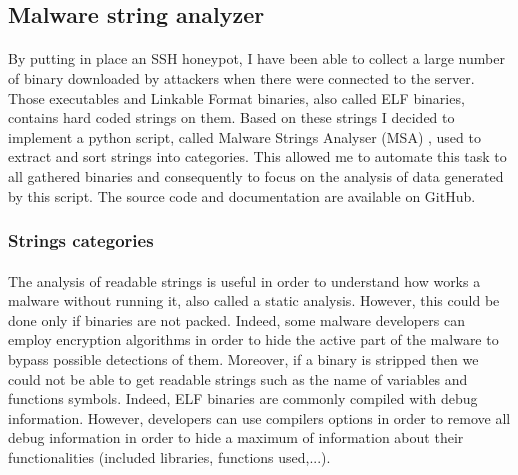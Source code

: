 \subsection{Malware string analyzer} %

\paragraph{}

By putting in place an SSH honeypot, I have been able to collect a large number of binary 
downloaded by attackers when there were connected to the server. Those executables and 
Linkable Format binaries, also called ELF binaries, contains hard coded strings on them.
Based on these strings I decided to implement a python script, called Malware Strings 
Analyser (MSA) \cite{msa}, used to extract and sort strings into categories. This allowed me to 
automate this task to all gathered binaries and consequently to focus on the analysis of 
data generated by this script. The source code and documentation are available on GitHub.

\subsubsection{Strings categories} %

\paragraph{}

The analysis of readable strings is useful in order to understand how works a malware
without running it, also called a static analysis. However, this could be done only if
binaries are not packed. Indeed, some malware developers can employ encryption algorithms
in order to hide the active part of the malware to bypass possible detections of them.
Moreover, if a binary is stripped then we could not be able to get readable
strings such as the name of variables and functions symbols. Indeed, ELF binaries are 
commonly compiled with debug information. However, developers can use compilers options in
order to remove all debug information in order to hide a maximum of information about their
functionalities (included libraries, functions used,...).

